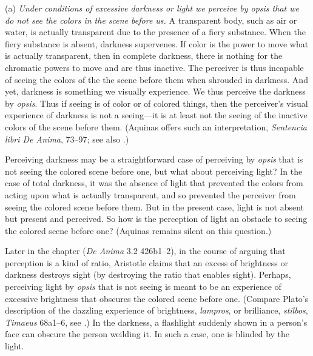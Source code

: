 (a) \emph{Under conditions of excessive darkness or light we perceive by \emph{opsis} that we do not see the colors in the scene before us.} A transparent body, such as air or water, is actually transparent due to the presence of a fiery substance. When the fiery substance is absent, darkness supervenes. If color is the power to move what is actually transparent, then in complete darkness, there is nothing for the chromatic powers to move and are thus inactive. The perceiver is thus incapable of seeing the colors of the the scene before them when shrouded in darkness. And yet, darkness is something we visually experience. We thus perceive the darkness by \emph{opsis}. Thus if seeing is of color or of colored things, then the perceiver's visual experience of darkness is not a seeing—it is at least not the seeing of the inactive colors of the scene before them. (Aquinas offers such an interpretation, \emph{Sentencia libri De Anima}, 73–97; see also \citealt[402]{Osborne:1983le}.)

Perceiving darkness may be a straightforward case of perceiving by \emph{opsis} that is not seeing the colored scene before one, but what about perceiving light? In the case of total darkness, it was the absence of light that prevented the colors from acting upon what is actually transparent, and so prevented the perceiver from seeing the colored scene before them. But in the present case, light is not absent but present and perceived. So how is the perception of light an obstacle to seeing the colored scene before one? (Aquinas remains silent on this question.)


Later in the chapter (\emph{De Anima} 3.2 426b1–2), in the course of arguing that perception is a kind of ratio, Aristotle claims that an excess of brightness or darkness destroys sight (by destroying the ratio that enables sight). Perhaps, perceiving light by \emph{opsis} that is not seeing is meant to be an experience of excessive brightness that obscures the colored scene before one. (Compare Plato's description of the dazzling experience of brightness, \emph{lampros}, or brilliance, \emph{stilbos}, \emph{Timaeus} 68a1–6, see \citealt[72–7]{Kalderon:2022kl}.) In the darkness, a flashlight suddenly shown in a person's face can obscure the person weilding it. In such a case, one is blinded by the light.

